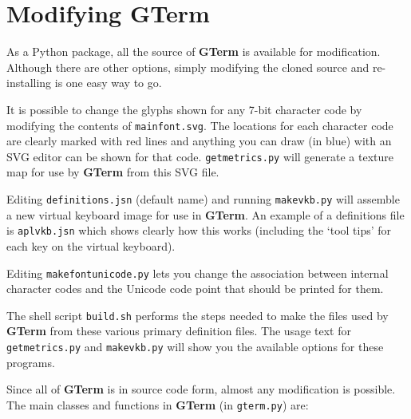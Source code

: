 \documentclass[a4paper,twoside,11pt]{article}
\newcommand{\newpara}{\par\vspace{4mm}\noindent}
\begin{document}
\section{Modifying \textbf{GTerm}}
As a Python package, all the source of \textbf{GTerm} is available for modification. Although there are other
options, simply modifying the cloned source and re-installing is one easy way to go.
\newpara
It is possible to change the glyphs shown for any 7-bit character code by modifying the contents of
\texttt{mainfont.svg}. The locations for each character code are clearly marked with red lines and 
anything you can draw (in blue) with an SVG editor can be shown for that code. \texttt{getmetrics.py} will generate
a texture map for use by \textbf{GTerm} from this SVG file.
\newpara
Editing \texttt{definitions.jsn} (default name) and running \texttt{makevkb.py} will assemble a new virtual keyboard image for
use in \textbf{GTerm}. An example of a definitions file is \texttt{aplvkb.jsn} which shows clearly how this works (including the
`tool tips' for each key on the virtual keyboard).
\newpara
Editing \texttt{makefontunicode.py} lets you change the association between internal character codes and the Unicode
code point that should be printed for them.
\newpara
The shell script \texttt{build.sh} performs the steps needed to make the files used by \textbf{GTerm} from these various primary
definition files. The usage text for \texttt{getmetrics.py} and \texttt{makevkb.py} will show you the available options
for these programs.
\newpara
Since all of \textbf{GTerm} is in source code form, almost any modification is possible. The main classes and functions in
\textbf{GTerm} (in \texttt{gterm.py}) are:
\end{document}
